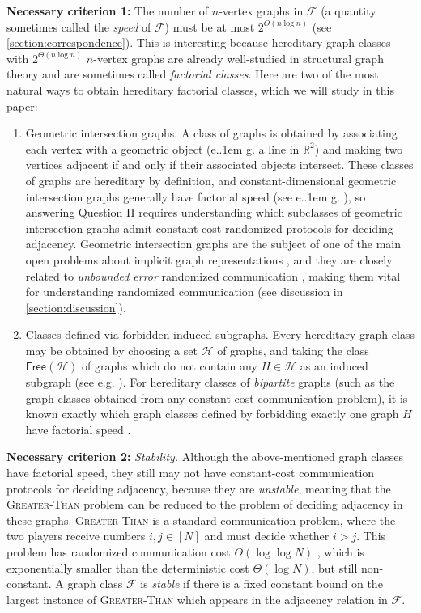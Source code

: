 \documentclass{article}
\makeatletter
\newcommand{\cF}{\ensuremath{\mathcal{F}}}
\newcommand{\cH}{\ensuremath{\mathcal{H}}}
\newcommand{\bR}{\ensuremath{\mathbb{R}}}
\newcommand*\eg{e.\kern.1em g.\@\xspace} %
\newcommand{\free}{\mathsf{Free}}
\makeatother
\begin{document}
\noindent
\textbf{Necessary criterion 1:} The number of $n$-vertex graphs in $\cF$ (a quantity sometimes
called the \emph{speed} of $\cF$) must be at most $2^{O(n \log n)}$ (see
\cref{section:correspondence}).  This is interesting because hereditary graph classes with
$2^{\Theta(n \log n)}$ $n$-vertex graphs are already well-studied in structural graph theory and are
sometimes called \emph{factorial classes}. Here are two of the most natural ways to obtain
hereditary factorial classes, which we will study in this paper:
\begin{enumerate}
\item Geometric intersection graphs. A class of graphs is obtained by associating each vertex with a
geometric object (\eg a line in $\bR^2$) and making two vertices adjacent if and only if their
associated objects intersect. These classes of graphs are hereditary by definition, and
constant-dimensional geometric intersection graphs generally have factorial speed (see \eg
\cite{Spin03}), so answering Question II requires understanding which subclasses of geometric
intersection graphs admit constant-cost randomized protocols for deciding adjacency. Geometric
intersection graphs are the subject of one of the main open problems about implicit graph
representations \cite{Spin03}, and they are closely related to 
\emph{unbounded error} randomized communication \cite{PS86}, making them vital for understanding
randomized communication (see discussion in \cref{section:discussion}).
\item Classes defined via forbidden induced subgraphs. Every hereditary graph class may be obtained by choosing a set
$\cH$ of graphs, and taking the class $\free(\cH)$ of graphs which do not contain any $H \in \cH$ as
an induced subgraph (see e.g. \cite[Chapter 2]{KL15}). For hereditary classes of \emph{bipartite} graphs (such as the graph classes
obtained from any constant-cost communication problem), it is known exactly which graph classes
defined by forbidding exactly one graph $H$ have factorial speed \cite{All09,LZ17}.
\end{enumerate}

\noindent\textbf{Necessary criterion 2:} \emph{Stability.}
Although the above-mentioned graph classes have factorial speed, they still may not have constant-cost
communication protocols for deciding adjacency, because they are \emph{unstable}, meaning that the
\textsc{Greater-Than} problem can be reduced to the problem of deciding adjacency in these graphs.
\textsc{Greater-Than} is a standard communication problem, where the two players receive numbers
$i,j \in [N]$ and must decide whether $i > j$. This problem has randomized communication cost
$\Theta(\log\log N)$ \cite{Nis93,Viol15}, which is exponentially smaller than the deterministic
cost $\Theta(\log N)$, but still non-constant. A graph class $\cF$ is \emph{stable} if there is a
fixed constant bound on the largest instance of \textsc{Greater-Than} which appears in the adjacency
relation in $\cF$.
\end{document}
